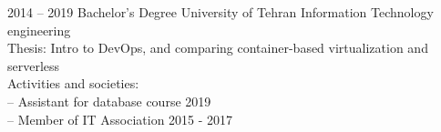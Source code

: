 \begin{entrylist}
    \entry
    {2014 -- 2019}
    {Bachelor's Degree}
    {University of Tehran}
    {
        Information Technology engineering \\
        Thesis: Intro to DevOps, and comparing container-based virtualization and serverless \\
        Activities and societies: \\
        -- Assistant for database course 2019 \\
        -- Member of IT Association 2015 - 2017 \\
    }
\end{entrylist}








